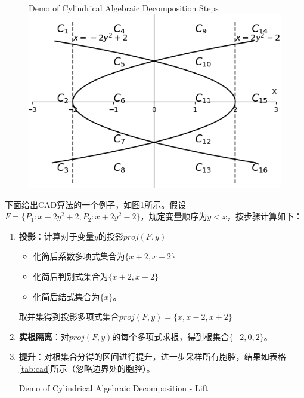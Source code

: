 \begin{example}
\begin{figure}[t]
    \centering
     {Demo of Cylindrical Algebraic Decomposition Steps}
    \includegraphics[width=0.6\columnwidth]{Img/cad.png}
\label{fig:CAD}
\end{figure}

下面给出CAD算法的一个例子，如图\ref{fig:CAD}所示。假设$F = \{P_1: x - 2y^2 + 2, P_2: x + 2y^2 - 2\}$，规定变量顺序为$y < x$，按步骤计算如下：
\begin{enumerate}
    \item \textbf{投影}：计算对于变量$y$的投影$proj(F, y)$
    \begin{itemize}
        \item 化简后系数多项式集合为$\{x + 2, x - 2\}$
        \item 化简后判别式集合为$\{x + 2, x - 2\}$
        \item 化简后结式集合为$\{x\}$。
    \end{itemize}
    取并集得到投影多项式集合$proj(F, y) = \{x, x - 2, x + 2\}$

    \item \textbf{实根隔离}：对$proj(F, y)$的每个多项式求根，得到根集合$\{-2, 0, 2\}$。
    \item \textbf{提升}：对根集合分得的区间进行提升，进一步采样所有胞腔，结果如表格\ref{tab:cad}所示（忽略边界处的胞腔）。
    \begin{table}
        \centering
         {Demo of Cylindrical Algebraic Decomposition - Lift}
\end{table}
\end{enumerate}
\end{example}
